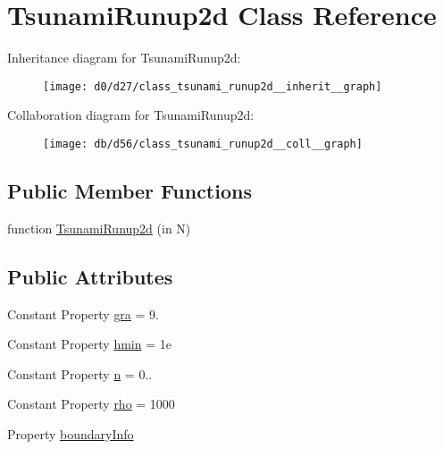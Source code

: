 \hypertarget{class_tsunami_runup2d}{}\section{Tsunami\+Runup2d Class Reference}
\label{class_tsunami_runup2d}


Inheritance diagram for Tsunami\+Runup2d\+:
\nopagebreak
\begin{figure}[H]
\begin{center}
\leavevmode
\texttt{[image: d0/d27/class\_tsunami\_runup2d\_\_inherit\_\_graph]}
\end{center}
\end{figure}


Collaboration diagram for Tsunami\+Runup2d\+:
\nopagebreak
\begin{figure}[H]
\begin{center}
\leavevmode
\texttt{[image: db/d56/class\_tsunami\_runup2d\_\_coll\_\_graph]}
\end{center}
\end{figure}
\subsection*{Public Member Functions}
\begin{DoxyCompactItemize}
\item 
function \hyperlink{class_tsunami_runup2d_a842650c5a09f2235dbf965ee9a3996d2}{Tsunami\+Runup2d} (in N)
\end{DoxyCompactItemize}
\subsection*{Public Attributes}
\begin{DoxyCompactItemize}
\item 
Constant Property \hyperlink{class_tsunami_runup2d_ac408f111a1d3243cf8b554ac10d1e157}{gra} = 9.
\item 
Constant Property \hyperlink{class_tsunami_runup2d_a423312afe6ff8d920c82cd05778ae76e}{hmin} = 1e
\item 
Constant Property \hyperlink{class_tsunami_runup2d_ad0e04847c45de6ede416517251947b88}{n} = 0..
\item 
Constant Property \hyperlink{class_tsunami_runup2d_ab1a6c8b72e719274dd35055da2d63c6c}{rho} = 1000
\item 
Property \hyperlink{class_tsunami_runup2d_a1abbb35ec7748a4d808fb7d859848882}{boundary\+Info}
\end{DoxyCompactItemize}
